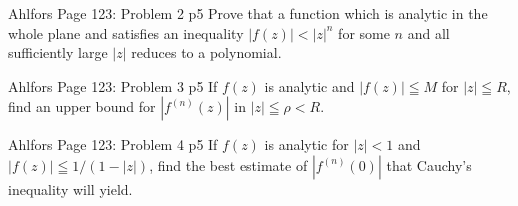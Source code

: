 \documentclass[a4paper, 11pt]{article}
\begin{document}
	
	\begin{problem}{%
			Ahlfors Page 123: Problem 2
		}{p5%
		}
		Prove that a function which is analytic in the whole plane and satisfies an inequality $|f(z)|<|z|^n$ for some $n$ and all sufficiently large $|z|$ reduces to a polynomial.
		
	\end{problem}
	
	\solve{
		
}
	

\begin{problem}{%
		Ahlfors Page 123: Problem 3
	}{p5%
	}
If $f(z)$ is analytic and $|f(z)| \leqq M$ for $|z| \leqq R$, find an upper bound for $\left|f^{(n)}(z)\right|$ in $|z| \leqq \rho<R$.
	
\end{problem}

\solve{
	
}


\begin{problem}{%
		Ahlfors Page 123: Problem 4
	}{p5%
	}
		If $f(z)$ is analytic for $|z|<1$ and $|f(z)| \leqq 1 /(1-|z|)$, find the best estimate of $\left|f^{(n)}(0)\right|$ that Cauchy's inequality will yield.
	
\end{problem}

\end{document}
